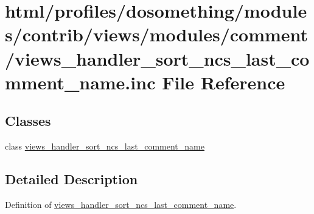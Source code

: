 \hypertarget{views__handler__sort__ncs__last__comment__name_8inc}{
\section{html/profiles/dosomething/modules/contrib/views/modules/comment/views\_\-handler\_\-sort\_\-ncs\_\-last\_\-comment\_\-name.inc File Reference}
\label{views__handler__sort__ncs__last__comment__name_8inc}
}
\subsection*{Classes}
\begin{DoxyCompactItemize}
\item 
class \hyperlink{classviews__handler__sort__ncs__last__comment__name}{views\_\-handler\_\-sort\_\-ncs\_\-last\_\-comment\_\-name}
\end{DoxyCompactItemize}


\subsection{Detailed Description}
Definition of \hyperlink{classviews__handler__sort__ncs__last__comment__name}{views\_\-handler\_\-sort\_\-ncs\_\-last\_\-comment\_\-name}. 